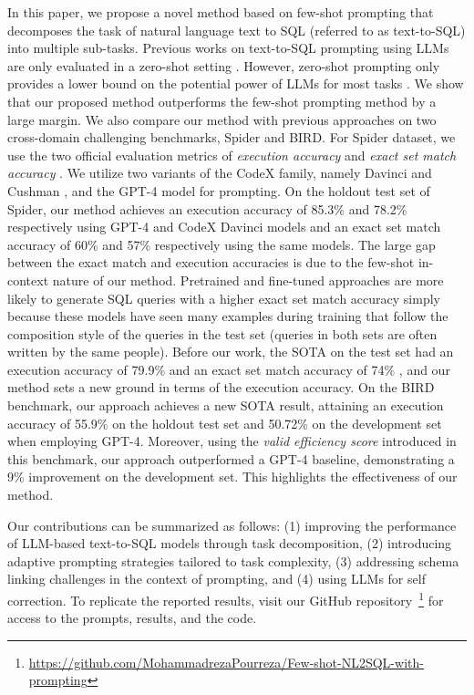 In this paper, we propose a novel method based on few-shot prompting that decomposes the task of natural language text to SQL (referred to as text-to-SQL) into multiple sub-tasks. %
Previous works on text-to-SQL prompting using LLMs are only evaluated in a zero-shot setting \citep{rajkumar2022evaluating,liu2023comprehensive}. However, zero-shot prompting only provides a lower bound on the potential power of LLMs for most tasks \citep{zhang2022automatic, kojima2022large, wei2022chain, wei2021finetuned, brown2020language}. We show that our proposed method outperforms the few-shot prompting method by a large margin. We also compare our method with previous approaches on two cross-domain challenging benchmarks, Spider and BIRD. For Spider dataset, we use the two official evaluation metrics of \textit{execution accuracy} and \textit{exact set match accuracy} \citep{ruiqi20}. We utilize two variants of the CodeX family, namely Davinci and Cushman \citep{chen2021evaluating}, and the GPT-4 model for prompting. On the holdout test set of Spider, our method achieves an execution accuracy of 85.3\% and 78.2\% respectively using GPT-4 and CodeX Davinci models and an exact set match accuracy of 60\% and 57\% respectively using the same models. The large gap between the exact match and execution accuracies is due to the few-shot in-context nature of our method. Pretrained and fine-tuned approaches are more likely to generate SQL queries with a higher exact set match accuracy simply because these models have seen many examples during training that follow the composition style of the queries in the test set (queries in both sets are often written by the same people). Before our work, the SOTA on the test set had an execution accuracy of 79.9\% \citep{li2023decoupling} and an exact set match accuracy of 74\% \citep{li2023graphix}, and our method sets a new ground in terms of the execution accuracy. On the BIRD benchmark, our approach achieves a new SOTA result, attaining an execution accuracy of 55.9\% on the holdout test set and 50.72\% on the development set when employing GPT-4. Moreover, using the \textit{valid efficiency score} introduced in this benchmark, our approach outperformed a GPT-4 baseline, demonstrating a 9\% improvement on the development set. This highlights the effectiveness of our method.

Our contributions can be summarized as follows: (1) improving the performance of LLM-based text-to-SQL models through task decomposition, (2) introducing adaptive prompting strategies tailored to task complexity, (3) addressing schema linking challenges in the context of prompting, and (4) using LLMs for self correction. 
To replicate the reported results, visit our GitHub repository~\footnote{\url{https://github.com/MohammadrezaPourreza/Few-shot-NL2SQL-with-prompting}} for access to the prompts, results, and the code.

